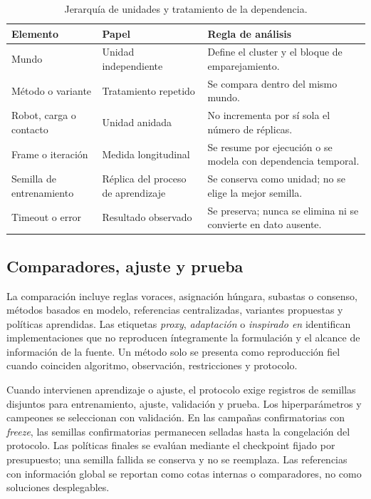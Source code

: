 \begin{table}[H]
\centering
\footnotesize
\begin{tabularx}{\textwidth}{@{}p{}p{}X@{}}
\toprule
Elemento & Papel & Regla de análisis \\
\midrule
Mundo & Unidad independiente & Define el cluster y el bloque de emparejamiento. \\
Método o variante & Tratamiento repetido & Se compara dentro del mismo mundo. \\
Robot, carga o contacto & Unidad anidada & No incrementa por sí sola el número de réplicas. \\
Frame o iteración & Medida longitudinal & Se resume por ejecución o se modela con dependencia temporal. \\
Semilla de entrenamiento & Réplica del proceso de aprendizaje & Se conserva como unidad; no se elige la mejor semilla. \\
Timeout o error & Resultado observado & Se preserva; nunca se elimina ni se convierte en dato ausente. \\
\bottomrule
\end{tabularx}
\caption{Jerarquía de unidades y tratamiento de la dependencia.}
\label{tab:variables-diseno-experimental}
\end{table}

\subsection{Comparadores, ajuste y prueba}

La comparación incluye reglas voraces, asignación húngara, subastas o consenso, métodos basados en modelo, referencias centralizadas, variantes propuestas y políticas aprendidas. Las etiquetas \emph{proxy}, \emph{adaptación} o \emph{inspirado en} identifican implementaciones que no reproducen íntegramente la formulación y el alcance de información de la fuente. Un método solo se presenta como reproducción fiel cuando coinciden algoritmo, observación, restricciones y protocolo.

Cuando intervienen aprendizaje o ajuste, el protocolo exige registros de semillas disjuntos para entrenamiento, ajuste, validación y prueba. Los hiperparámetros y campeones se seleccionan con validación. En las campañas confirmatorias con \emph{freeze}, las semillas confirmatorias permanecen selladas hasta la congelación del protocolo. Las políticas finales se evalúan mediante el checkpoint fijado por presupuesto; una semilla fallida se conserva y no se reemplaza. Las referencias con información global se reportan como cotas internas o comparadores, no como soluciones desplegables.


